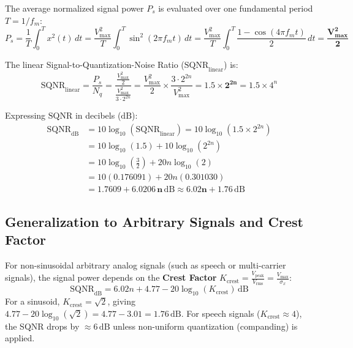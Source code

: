 \documentclass[11pt,a4paper]{article}
\begin{document}
The average normalized signal power $P_s$ is evaluated over one fundamental period $T = 1/f_m$:
\begin{equation}
P_s = \frac{1}{T} \int_0^T x^2(t) \, dt = \frac{V_{\max}^2}{T} \int_0^T \sin^2(2\pi f_m t) \, dt = \frac{V_{\max}^2}{T} \int_0^T \frac{1 - \cos(4\pi f_m t)}{2} \, dt = \mathbf{\frac{V_{\max}^2}{2}}
\end{equation}

The linear Signal-to-Quantization-Noise Ratio ($\mathrm{SQNR}_{\mathrm{linear}}$) is:
\begin{equation}
\mathrm{SQNR}_{\mathrm{linear}} = \frac{P_s}{N_q} = \frac{\frac{V_{\max}^2}{2}}{\frac{V_{\max}^2}{3 \cdot 2^{2n}}} = \frac{V_{\max}^2}{2} \times \frac{3 \cdot 2^{2n}}{V_{\max}^2} = \mathbf{1.5 \times 2^{2n}} = 1.5 \times 4^n
\end{equation}

Expressing $\mathrm{SQNR}$ in decibels ($\mathrm{dB}$):
\begin{align}
\mathrm{SQNR}_{\mathrm{dB}} &= 10 \log_{10}(\mathrm{SQNR}_{\mathrm{linear}}) = 10 \log_{10}(1.5 \times 2^{2n}) \\
&= 10 \log_{10}(1.5) + 10 \log_{10}(2^{2n}) \\
&= 10 \log_{10}\left(\frac{3}{2}\right) + 20 n \log_{10}(2) \\
&= 10 (0.176091) + 20 n (0.301030) \\
&= \mathbf{1.7609 + 6.0206 \, n \, \mathrm{dB}} \approx \mathbf{6.02 n + 1.76 \, \mathrm{dB}}
\end{align}

\subsection{Generalization to Arbitrary Signals and Crest Factor}
For non-sinusoidal arbitrary analog signals (such as speech or multi-carrier signals), the signal power depends on the \textbf{Crest Factor} $K_{\mathrm{crest}} = \frac{V_{\mathrm{peak}}}{V_{\mathrm{rms}}} = \frac{V_{\max}}{\sigma_x}$:
\begin{equation}
\mathrm{SQNR}_{\mathrm{dB}} = 6.02 n + 4.77 - 20 \log_{10}(K_{\mathrm{crest}}) \, \mathrm{dB}
\end{equation}
For a sinusoid, $K_{\mathrm{crest}} = \sqrt{2}$, giving $4.77 - 20\log_{10}(\sqrt{2}) = 4.77 - 3.01 = 1.76\,\mathrm{dB}$. For speech signals ($K_{\mathrm{crest}} \approx 4$), the SQNR drops by $\approx 6\,\mathrm{dB}$ unless non-uniform quantization (companding) is applied.
\end{document}
